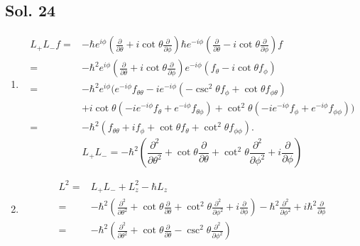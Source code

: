    \subsection*{Sol. 24}
\begin{enumerate}
    \item 
    \begin{align*}
        L_+L_-f
        =&-\hbar 
        e^{i\phi}
        \left(
        \frac{\partial}{\partial\theta}
        +i\cot\theta  
        \frac{\partial}{\partial\phi}
        \right)
        \hbar 
        e^{-i\phi}
        \left(
        \frac{\partial}{\partial\theta}
        -
        i\cot\theta  
        \frac{\partial}{\partial\phi}
        \right)f\\
        =&-\hbar^2 
        e^{i\phi}
        \left(
        \frac{\partial}{\partial\theta}
        +i\cot\theta  
        \frac{\partial}{\partial\phi}
        \right)
        e^{-i\phi}
        (f_\theta
        -i\cot\theta f_\phi)\\
        =&
        -\hbar^2
        e^{i\phi}
        (e^{-i\phi}f_{\theta\theta} 
        -ie^{-i\phi}(-\csc^2\theta f_\phi + \cot\theta f_{\phi\theta})\\
        &+i\cot\theta
        (-ie^{-i\phi}f_\theta + 
        e^{-i\phi}f_{\theta\phi})
        +\cot^2\theta(-ie^{-i\phi}f_\phi + e^{-i\phi}f_{\phi\phi})
        )\\
        =&-\hbar^2(
        f_{\theta\theta}
        +
        if_\phi 
        +\cot\theta f_{\theta}
        +\cot^2\theta f_{\phi\phi}
        ).
    \end{align*}    
    $$
    L_+L_- = 
    -\hbar^2
    \left(
    \frac{\partial^2}{\partial\theta^2 }
    +\cot\theta
    \frac{\partial}{\partial\theta}
    +\cot^2\theta
    \frac{\partial^2}{\partial\phi^2}
    +i\frac{\partial}{\partial\phi}
    \right)
    $$
    \item 
    \begin{align*}
        L^2=&L_+L_-+L_z^2 -\hbar L_z\\
        =&
        -\hbar^2
    \left(
    \frac{\partial^2}{\partial\theta^2 }
    +\cot\theta
    \frac{\partial}{\partial\theta}
    +\cot^2\theta
    \frac{\partial^2}{\partial\phi^2}
    +i\frac{\partial}{\partial\phi}
    \right)
    -\hbar^2\frac{\partial^2}{\partial\phi^2}
    +i\hbar^2\frac{\partial}{\partial\phi}\\
    =&-\hbar^2\left(
    \frac{\partial^2}{\partial\theta^2 }
    +\cot\theta
    \frac{\partial}{\partial\theta}
    -\csc^2\theta
    \frac{\partial^2}{\partial\phi^2}
    \right)
    \end{align*}
    
\end{enumerate}

